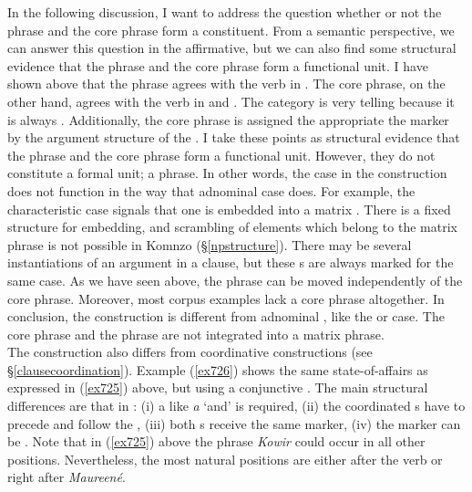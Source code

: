 In the following discussion, I want to address the question whether or not the  phrase and the core phrase form a constituent. From a semantic perspective, we can answer this question in the affirmative, but we can also find some structural evidence that the  phrase and the core phrase form a functional unit. I have shown above that the  phrase agrees with the verb in . The core phrase, on the other hand, agrees with the verb in  and . The  category is very telling because it is always . Additionally, the core phrase is assigned the appropriate the  marker by the argument structure of the . I take these points as structural evidence that the  phrase and the core phrase form a functional unit. However, they do not constitute a formal unit; a phrase. In other words, the  case in the  construction does not function in the way that adnominal case does. For example, the characteristic case signals that one  is embedded into a matrix . There is a fixed structure for embedding, and scrambling of elements which belong to the matrix phrase is not possible in Komnzo (\S{}\ref{npstructure}). There may be several instantiations of an argument in a clause, but these s are always marked for the same case. As we have seen above, the  phrase can be moved independently of the core phrase. Moreover, most corpus examples lack a core phrase altogether. In conclusion, the  construction is different from adnominal , like the  or  case. The core phrase and the  phrase are not integrated into a matrix phrase.\\

The  construction also differs from coordinative constructions (see \S{}\ref{clausecoordination}). Example (\ref{ex726}) shows the same state-of-affairs as expressed in (\ref{ex725}) above, but using a conjunctive . The main structural differences are that in : (i) a  like \emph{a} `and' is required, (ii) the coordinated s have to precede and follow the , (iii) both s receive the same  marker, (iv) the  marker can be . Note that in (\ref{ex725}) above the  phrase \emph{Kowir} could occur in all other positions. Nevertheless, the most natural positions are either after the verb or right after \emph{Maureené}.

